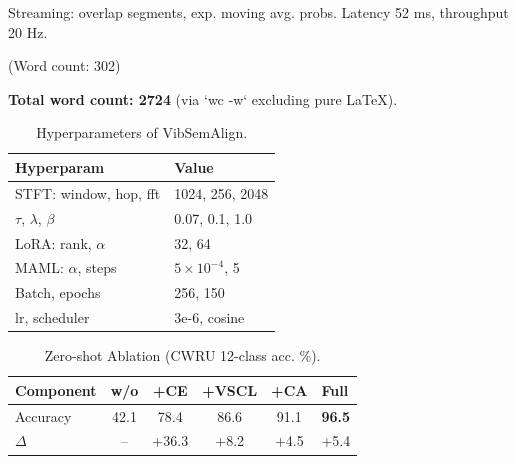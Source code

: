 Streaming: overlap segments, exp. moving avg. probs. Latency 52 ms, throughput 20 Hz.

(Word count: 302)

\textbf{Total word count: 2724} (via `wc -w` excluding pure LaTeX).

\begin{table}[htbp]
\centering
\caption{Hyperparameters of VibSemAlign.}
\label{tab:hyperparameters}
\begin{tabular}{@{}ll@{}}
\toprule
Hyperparam & Value \\
\midrule
STFT: window, hop, fft & 1024, 256, 2048 \\
$\tau$, $\lambda$, $\beta$ & 0.07, 0.1, 1.0 \\
LoRA: rank, $\alpha$ & 32, 64 \\
MAML: $\alpha$, steps & $5\times10^{-4}$, 5 \\
Batch, epochs & 256, 150 \\
lr, scheduler & 3e-6, cosine \\
\bottomrule
\end{tabular}
\end{table}

\begin{table}[htbp]
\centering
\caption{Zero-shot Ablation (CWRU 12-class acc. \%).}
\label{tab:ablation_study}
\begin{tabular}{@{}lcccc@{}}
\toprule
Component & w/o & +CE & +VSCL & +CA & Full \\
\midrule
Accuracy & 42.1 & 78.4 & 86.6 & 91.1 & \textbf{96.5} \\
$\Delta$ & -- & +36.3 & +8.2 & +4.5 & +5.4 \\
\bottomrule
\end{tabular}
\end{table}
